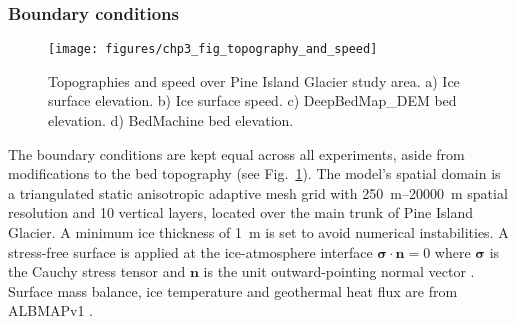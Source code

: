 





\subsubsection{Boundary conditions}

\begin{figure}[htbp]
  \texttt{[image: figures/chp3\_fig\_topography\_and\_speed]}
  \caption[Topographies and Speed over Pine Island Glacier]{
    Topographies and speed over Pine Island Glacier study area.
    a) Ice surface elevation.
    b) Ice surface speed.
    c) DeepBedMap\_DEM bed elevation.
    d) BedMachine bed elevation.
  }
  \label{fig:topo_and_speed}
\end{figure}

The boundary conditions are kept equal across all experiments, aside from modifications to the bed topography (see Fig.~\ref{fig:topo_and_speed}). %
The model's spatial domain is a triangulated static anisotropic adaptive mesh grid with \SIrange{250}{20000}{\metre} spatial resolution and 10 vertical layers, located over the main trunk of Pine Island Glacier.
A minimum ice thickness of \SI{1}{\metre} is set to avoid numerical instabilities.
A stress-free surface is applied at the ice-atmosphere interface $\boldsymbol{\sigma} \cdot \boldsymbol{n} = 0$ where $\boldsymbol{\sigma}$ is the Cauchy stress tensor and $\boldsymbol{n}$ is the unit outward-pointing normal vector \citep[][eq. 18]{LarourContinentalscalehigh2012}.
Surface mass balance, ice temperature and geothermal heat flux are from ALBMAPv1 \citep{LeBrocqimprovedAntarcticdataset2010}.


